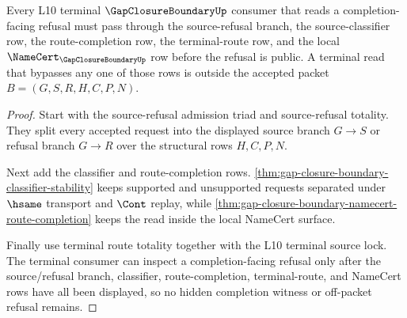 \begin{theorem}
\label{thm:gap-closure-boundary-l10-source-lock-totality}
Every L10 terminal $\GapClosureBoundaryUp$ consumer that reads a completion-facing refusal must pass through the source-refusal branch, the source-classifier row, the route-completion row, the terminal-route row, and the local $\NameCert_{\GapClosureBoundaryUp}$ row before the refusal is public. A terminal read that bypasses any one of those rows is outside the accepted packet $B=(G,S,R,H,C,P,N)$.
\end{theorem}
\begin{proof}
Start with the source-refusal admission triad and source-refusal totality. They split every accepted request into the displayed source branch $G \longrightarrow S$ or refusal branch $G \longrightarrow R$ over the structural rows $H,C,P,N$.

Next add the classifier and route-completion rows. \autoref{thm:gap-closure-boundary-classifier-stability} keeps supported and unsupported requests separated under $\hsame$ transport and $\Cont$ replay, while \autoref{thm:gap-closure-boundary-namecert-route-completion} keeps the read inside the local NameCert surface.

Finally use terminal route totality together with the L10 terminal source lock. The terminal consumer can inspect a completion-facing refusal only after the source/refusal branch, classifier, route-completion, terminal-route, and NameCert rows have all been displayed, so no hidden completion witness or off-packet refusal remains.
\end{proof}
